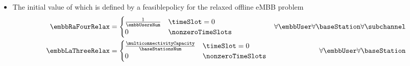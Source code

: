 \begin{frame}
  \begin{itemize}
    \item The initial value of which is defined by a feasible\proofFootnote policy for the relaxed offline eMBB problem
      \begin{align}
        \embbRaFourRelax &=
          \begin{cases}
            \frac{1}{\embbUsersNum} &\timeSlot = 0\\
            0 &\nonzeroTimeSlots
          \end{cases} &\forall\embbUser \forall\baseStation \forall\subchannel\\
        \embbLaThreeRelax &=
          \begin{cases}
            \frac{\multiconnectivityCapacity}{\baseStationsNum} &\timeSlot = 0\\
            0 &\nonzeroTimeSlots
          \end{cases} &\forall\embbUser \forall\baseStation
      \end{align}
  \end{itemize}
\end{frame}
